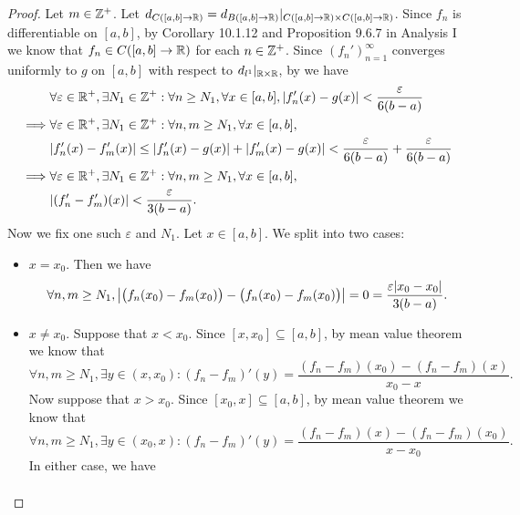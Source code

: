 \begin{proof}
  Let \(m \in \mathbb{Z}^+\).
  Let \(d_{C([a, b] \to \mathbb{R})} = d_{B([a, b] \to \mathbb{R})}|_{C([a, b] \to \mathbb{R}) \times C([a, b] \to \mathbb{R})}\).
  Since \(f_n\) is differentiable on \([a, b]\), by Corollary 10.1.12 and Proposition 9.6.7 in Analysis I we know that \(f_n \in C([a, b] \to \mathbb{R})\) for each \(n \in \mathbb{Z}^+\).
  Since \((f_n')_{n = 1}^\infty\) converges uniformly to \(g\) on \([a, b]\) with respect to \(d_{l^1}|_{\mathbb{R} \times \mathbb{R}}\), by  we have
  \begin{align*}
             & \forall \varepsilon \in \R^+, \exists N_1 \in \Z^+ : \forall n \geq N_1, \forall x \in [a, b], \abs{f_n'(x) - g(x)} < \dfrac{\varepsilon}{6(b - a)} \\
    \implies & \forall \varepsilon \in \R^+, \exists N_1 \in \Z^+ : \forall n, m \geq N_1, \forall x \in [a, b],                                                   \\
             & \abs{f_n'(x) - f_m'(x)} \leq \abs{f_n'(x) - g(x)} + \abs{f_m'(x) - g(x)} < \dfrac{\varepsilon}{6(b - a)} + \dfrac{\varepsilon}{6(b - a)}            \\
    \implies & \forall \varepsilon \in \R^+, \exists N_1 \in \Z^+ : \forall n, m \geq N_1, \forall x \in [a, b],                                                   \\
             & \abs{(f_n' - f_m')(x)} < \dfrac{\varepsilon}{3(b - a)}.
  \end{align*}
  Now we fix one such \(\varepsilon\) and \(N_1\).
  Let \(x \in [a, b]\).
  We split into two cases:
  \begin{itemize}
    \item \(x = x_0\).
          Then we have
          \[
            \forall n, m \geq N_1, \abs{\big(f_n(x_0) - f_m(x_0)\big) - \big(f_n(x_0) - f_m(x_0)\big)} = 0 = \dfrac{\varepsilon \abs{x_0 - x_0}}{3(b - a)}.
          \]
    \item \(x \neq x_0\).
          Suppose that \(x < x_0\).
          Since \([x, x_0] \subseteq [a, b]\), by mean value theorem we know that
          \[
            \forall n, m \geq N_1, \exists y \in (x, x_0) : (f_n - f_m)'(y) = \dfrac{(f_n - f_m)(x_0) - (f_n - f_m)(x)}{x_0 - x}.
          \]
          Now suppose that \(x > x_0\).
          Since \([x_0, x] \subseteq [a, b]\), by mean value theorem we know that
          \[
            \forall n, m \geq N_1, \exists y \in (x_0, x) : (f_n - f_m)'(y) = \dfrac{(f_n - f_m)(x) - (f_n - f_m)(x_0)}{x - x_0}.
          \]
          In either case, we have
          \begin{align*}

\end{align*}
\end{itemize}
\end{proof}
